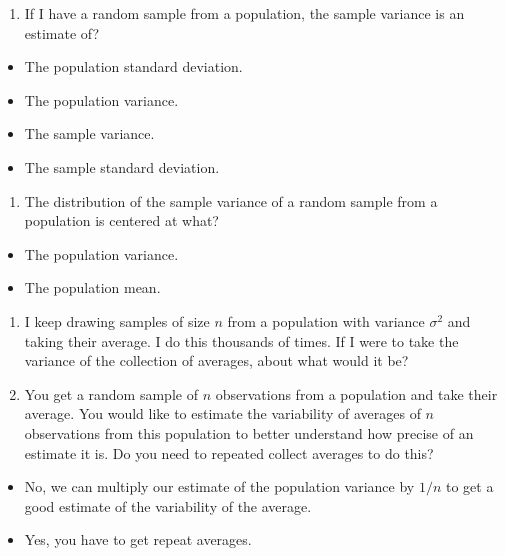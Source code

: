 \documentclass[]{article}
\begin{document}
\begin{enumerate}
\def\labelenumi{\arabic{enumi}.}
\itemsep1pt\parskip0pt
\item
  If I have a random sample from a population, the sample variance is an
  estimate of?
\end{enumerate}

\begin{itemize}
\itemsep1pt\parskip0pt
\item
  The population standard deviation.
\item
  The population variance.
\item
  The sample variance.
\item
  The sample standard deviation.
\end{itemize}

\begin{enumerate}
\def\labelenumi{\arabic{enumi}.}
\setcounter{enumi}{1}
\itemsep1pt\parskip0pt
\item
  The distribution of the sample variance of a random sample from a
  population is centered at what?
\end{enumerate}

\begin{itemize}
\itemsep1pt\parskip0pt
\item
  The population variance.
\item
  The population mean.
\end{itemize}

\begin{enumerate}
\def\labelenumi{\arabic{enumi}.}
\setcounter{enumi}{2}
\itemsep1pt\parskip0pt
\item
  I keep drawing samples of size $n$ from a population with variance
  $\sigma^2$ and taking their average. I do this thousands of times. If
  I were to take the variance of the collection of averages, about what
  would it be?
\item
  You get a random sample of $n$ observations from a population and take
  their average. You would like to estimate the variability of averages
  of $n$ observations from this population to better understand how
  precise of an estimate it is. Do you need to repeated collect averages
  to do this?
\end{enumerate}

\begin{itemize}
\itemsep1pt\parskip0pt
\item
  No, we can multiply our estimate of the population variance by $1/n$
  to get a good estimate of the variability of the average.
\item
  Yes, you have to get repeat averages.
\end{itemize}
\end{document}
